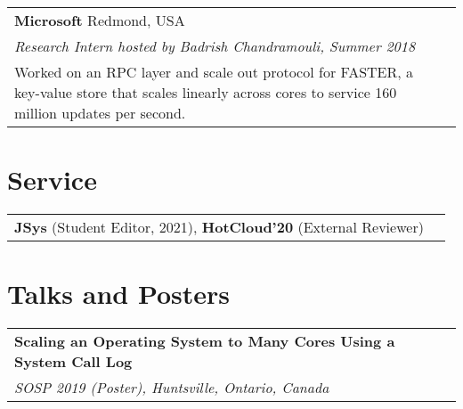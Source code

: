 \documentclass[margin,line]{res}
\begin{document}
\begin{resume}
\vspace{-7pt}
\begin{tabular}{@{}p{5.5in}p{4in}}
{\bf Microsoft} \dotfill Redmond, USA \\
{\small\em Research Intern hosted by Badrish Chandramouli, Summer 2018}\\
{\small Worked on an RPC layer and scale out protocol for FASTER, a
key-value store that scales linearly across cores to service 160 million
updates per second.}
\end{tabular}




\section{\sc Service}
\begin{tabular}{@{}p{5.5in}p{4in}}
{\bf JSys} {\small (Student Editor, 2021)}, {\bf HotCloud'20} {\small
(External Reviewer)}\\
\end{tabular}

\section{\sc Talks and Posters}
\begin{tabular}{@{}p{5.5in}p{4in}}
{\bf Scaling an Operating System to Many Cores Using a System Call Log}\\
{\small\em SOSP 2019 (Poster), Huntsville, Ontario, Canada}\\
\end{tabular}


\end{resume}
\end{document}
